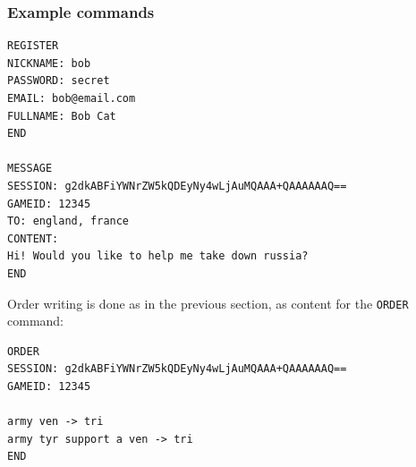 \documentclass[11pt,a4paper]{report}
\begin{document}
\subsubsection*{Example commands}
\label{sec:examplecommands}
\begin{verbatim}
REGISTER
NICKNAME: bob
PASSWORD: secret
EMAIL: bob@email.com
FULLNAME: Bob Cat
END

MESSAGE
SESSION: g2dkABFiYWNrZW5kQDEyNy4wLjAuMQAAA+QAAAAAAQ==
GAMEID: 12345
TO: england, france
CONTENT:
Hi! Would you like to help me take down russia?
END
\end{verbatim}

Order writing is done as in the previous section, as content for the
\verb|ORDER| command:
\begin{verbatim}
ORDER
SESSION: g2dkABFiYWNrZW5kQDEyNy4wLjAuMQAAA+QAAAAAAQ==
GAMEID: 12345

army ven -> tri
army tyr support a ven -> tri
END
\end{verbatim}
\end{document}
